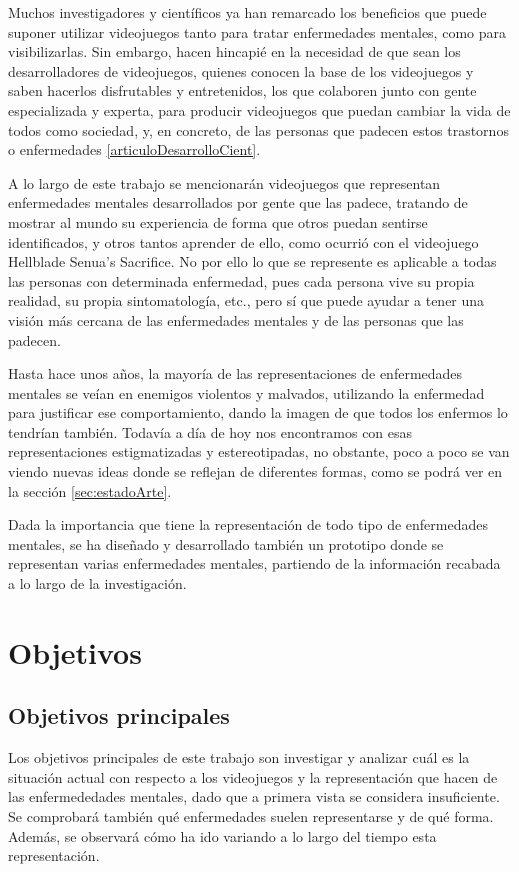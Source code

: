 \documentclass[12pt, a4paper,twoside,titlepage]{book}
\begin{document}
Muchos investigadores y científicos ya han remarcado los beneficios que puede suponer utilizar videojuegos tanto para tratar enfermedades mentales, como para visibilizarlas. Sin embargo, hacen hincapié en la necesidad de que sean los desarrolladores de videojuegos, quienes conocen la base de los videojuegos y saben hacerlos disfrutables y entretenidos, los que colaboren junto con gente especializada y experta, para producir videojuegos que puedan cambiar la vida de todos como sociedad, y, en concreto, de las personas que padecen estos trastornos o enfermedades \ref{articuloDesarrolloCient}.

A lo largo de este trabajo se mencionarán videojuegos que representan enfermedades mentales desarrollados por gente que las padece, tratando de mostrar al mundo su experiencia de forma que otros puedan sentirse identificados, y otros tantos aprender de ello, como ocurrió con el videojuego Hellblade Senua's Sacrifice. No por ello lo que se represente es aplicable a todas las personas con determinada enfermedad, pues cada persona vive su propia realidad, su propia sintomatología, etc., pero sí que puede ayudar a tener una visión más cercana de las enfermedades mentales y de las personas que las padecen. 

Hasta hace unos años, la mayoría de las representaciones de enfermedades mentales se veían en enemigos violentos y malvados, utilizando la enfermedad para justificar ese comportamiento, dando la imagen de que todos los enfermos lo tendrían también. Todavía a día de hoy nos encontramos con esas representaciones estigmatizadas y estereotipadas, no obstante, poco a poco se van viendo nuevas ideas donde se reflejan de diferentes formas, como se podrá ver en la sección \ref{sec:estadoArte}. 

Dada la importancia que tiene la representación de todo tipo de enfermedades mentales, se ha diseñado y desarrollado también un prototipo donde se representan varias enfermedades mentales, partiendo de la información recabada a lo largo de la investigación.

\chapter{Objetivos}


\section{Objetivos principales}

    Los objetivos principales de este trabajo son investigar y analizar cuál es la situación actual con respecto a los videojuegos y la representación que hacen de las enfermededades mentales, dado que a primera vista se considera insuficiente. Se comprobará también qué enfermedades suelen representarse y de qué forma. Además, se observará cómo ha ido variando a lo largo del tiempo esta representación.
    
\end{document}
